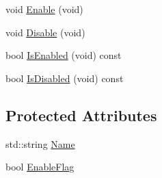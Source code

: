 {\bf }\par
\begin{DoxyCompactItemize}
\item 
void \hyperlink{classmts_command_base_adf28e824f5ec37238da2847f9c7f45be}{Enable} (void)
\item 
void \hyperlink{classmts_command_base_a2feea32ab49811d7d1e8c312344b94e6}{Disable} (void)
\item 
bool \hyperlink{classmts_command_base_ae439612eda561ee227655ab98c583954}{Is\-Enabled} (void) const 
\item 
bool \hyperlink{classmts_command_base_a087519c0f42eec1cb067051c371cf3ea}{Is\-Disabled} (void) const 
\end{DoxyCompactItemize}

\subsection*{Protected Attributes}
\begin{DoxyCompactItemize}
\item 
std\-::string \hyperlink{classmts_command_base_ad39ade733143ebd95ea8dd8732f899c6}{Name}
\item 
bool \hyperlink{classmts_command_base_a2bfcac24f5e4fc80bf32071da17533d1}{Enable\-Flag}
\end{DoxyCompactItemize}


